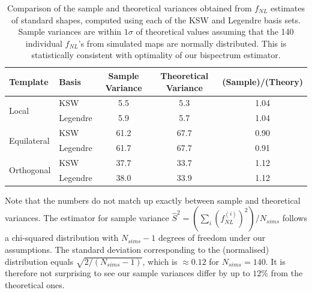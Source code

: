 \begin{table}[h]
	\caption{Comparison of the sample and theoretical variances obtained from $f_{NL}$ estimates of standard shapes, computed using each of the KSW and Legendre basis sets. Sample variances are within $1\sigma$ of theoretical values assuming that the 140 individual $f_{NL}$'s from simulated maps are normally distributed. This is statistically consistent with optimality of our bispectrum estimator.}
	\centering
	\label{table:trio_sample_and_theory_variances}
	\renewcommand{\arraystretch}{1.5} 
	\begin{tabular}{llccc}
		\toprule
		Template & Basis & Sample Variance &  Theoretical Variance &  (Sample)/(Theory) \\
		\midrule
		\multirow{2}{*}{Local} & KSW &  5.5 &       5.3 &               1.04 \\
		& Legendre &             5.9 &                  5.7 &               1.04 \\
		\multirow{2}{*}{Equilateral} & KSW &            61.2 &                 67.7 &               0.90 \\
		& Legendre &            61.7 &                 67.7 &               0.91 \\
		\multirow{2}{*}{Orthogonal} & KSW &            37.7 &                 33.7 &               1.12 \\
		& Legendre &            38.0 &                 33.9 &               1.12 \\
		\bottomrule
	\end{tabular}
\end{table}

Note that the numbers do not match up exactly between sample and theoretical variances. The estimator for sample variance $\hat{S}^2 = (\sum_i (f^{(i)}_{NL})^2 )/N_{sims}$ follows a chi-squared distribution with $N_{sims}-1$ degrees of freedom under our assumptions. The standard deviation corresponding to the (normalised) distribution equals $\sqrt{2/(N_{sims}-1)}$, which is $\approx 0.12$ for $N_{sims}=140$. It is therefore not surprising to see our sample variances differ by up to $12\%$ from the theoretical ones.

